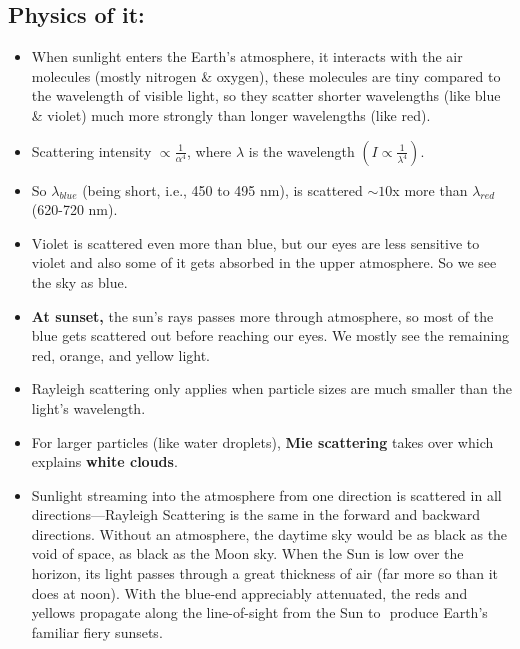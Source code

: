 \documentclass[12pt]{article}
\begin{document}
\subsection{Physics of it:}
\begin{itemize}
\item{When sunlight enters the Earth's atmosphere, it interacts with the air molecules (mostly nitrogen \& oxygen), these molecules are tiny compared to the wavelength of visible light, so they scatter shorter wavelengths (like blue \& violet) much more strongly than longer wavelengths (like red).}
\item{Scattering intensity $\propto \frac{1}{\alpha^4}$, where $\lambda$ is the wavelength
$\left(I\propto\frac{1}{\lambda^4}\right)$.}
\item{So $\lambda_{blue}$ (being short, i.e., 450 to 495 nm), is scattered $\sim 10$x more than $\lambda_{red}$\\(620-720 nm)}.
\item{Violet is scattered even more than blue, but our eyes are less sensitive to violet and also some of it gets absorbed in the upper atmosphere. So we see the sky as blue.}
\item{\textbf{At sunset,} the sun's rays passes more through atmosphere, so most of the blue gets scattered out before reaching our eyes. We mostly see the remaining red, orange, and yellow light.}
\item{Rayleigh scattering only applies when particle sizes are much smaller than the light's wavelength.}
\item{For larger particles (like water droplets), \textbf{Mie scattering} takes over which explains \textbf{white clouds}.}
\item{Sunlight streaming into the atmosphere from one direction is
scattered in all directions—Rayleigh Scattering is the same in
the forward and backward directions. Without an atmosphere,
the daytime sky would be as black as the void of space, as black
as the Moon sky. When the Sun is low over the horizon, its light
passes through a great thickness of air (far more so than it does
at noon). With the blue-end appreciably attenuated, the reds and
yellows propagate along the line-of-sight from the Sun to
­ produce Earth’s familiar fiery sunsets.}\\\\
\end{itemize}
\end{document}
